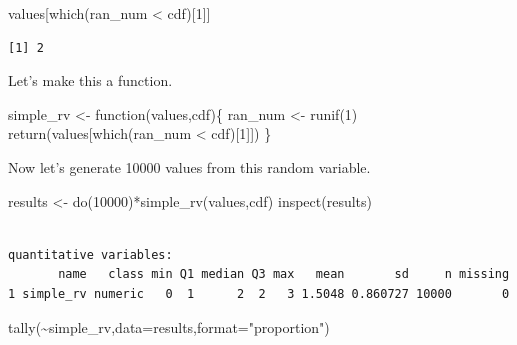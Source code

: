 \documentclass[
  letterpaper,
  DIV=11,
  numbers=noendperiod]{scrreprt}
\newenvironment{Shaded}{\begin{snugshade}}{\end{snugshade}}
\newcommand{\AttributeTok}[1]{\textcolor[rgb]{0.40,0.45,0.13}{#1}}
\newcommand{\ControlFlowTok}[1]{\textcolor[rgb]{0.00,0.23,0.31}{#1}}
\newcommand{\DecValTok}[1]{\textcolor[rgb]{0.68,0.00,0.00}{#1}}
\newcommand{\FunctionTok}[1]{\textcolor[rgb]{0.28,0.35,0.67}{#1}}
\newcommand{\NormalTok}[1]{\textcolor[rgb]{0.00,0.23,0.31}{#1}}
\newcommand{\OtherTok}[1]{\textcolor[rgb]{0.00,0.23,0.31}{#1}}
\newcommand{\SpecialCharTok}[1]{\textcolor[rgb]{0.37,0.37,0.37}{#1}}
\newcommand{\StringTok}[1]{\textcolor[rgb]{0.13,0.47,0.30}{#1}}
\begin{document}
\begin{Shaded}
\begin{Highlighting}[]
\NormalTok{values[}\FunctionTok{which}\NormalTok{(ran\_num }\SpecialCharTok{\textless{}}\NormalTok{ cdf)[}\DecValTok{1}\NormalTok{]]}
\end{Highlighting}
\end{Shaded}

\begin{verbatim}
[1] 2
\end{verbatim}

Let's make this a function.

\begin{Shaded}
\begin{Highlighting}[]
\NormalTok{simple\_rv }\OtherTok{\textless{}{-}} \ControlFlowTok{function}\NormalTok{(values,cdf)\{}
\NormalTok{ran\_num }\OtherTok{\textless{}{-}} \FunctionTok{runif}\NormalTok{(}\DecValTok{1}\NormalTok{)}
\FunctionTok{return}\NormalTok{(values[}\FunctionTok{which}\NormalTok{(ran\_num }\SpecialCharTok{\textless{}}\NormalTok{ cdf)[}\DecValTok{1}\NormalTok{]])}
\NormalTok{\}}
\end{Highlighting}
\end{Shaded}

Now let's generate 10000 values from this random variable.

\begin{Shaded}
\begin{Highlighting}[]
\NormalTok{results }\OtherTok{\textless{}{-}} \FunctionTok{do}\NormalTok{(}\DecValTok{10000}\NormalTok{)}\SpecialCharTok{*}\FunctionTok{simple\_rv}\NormalTok{(values,cdf)}
\FunctionTok{inspect}\NormalTok{(results)}
\end{Highlighting}
\end{Shaded}

\begin{verbatim}

quantitative variables:  
       name   class min Q1 median Q3 max   mean       sd     n missing
1 simple_rv numeric   0  1      2  2   3 1.5048 0.860727 10000       0
\end{verbatim}

\begin{Shaded}
\begin{Highlighting}[]
\FunctionTok{tally}\NormalTok{(}\SpecialCharTok{\textasciitilde{}}\NormalTok{simple\_rv,}\AttributeTok{data=}\NormalTok{results,}\AttributeTok{format=}\StringTok{"proportion"}\NormalTok{)}
\end{Highlighting}
\end{Shaded}
\end{document}
